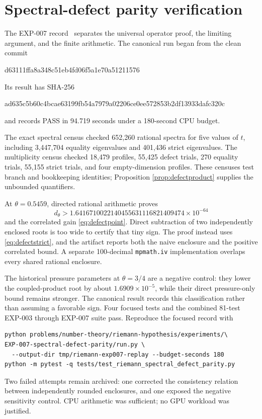 ﻿\documentclass[11pt]{article}
\theoremstyle{remark}
\begin{document}
\section{Spectral-defect parity verification}

The EXP-007 record~\cite{RecordVII} separates the universal operator proof,
the limiting argument, and the finite arithmetic. The canonical run began
from the clean commit
\begin{center}\small\ttfamily
d63111ffa8a348c51eb4fd06f5a1e70a51211576
\end{center}
Its result has SHA-256
\begin{center}\small\ttfamily
ad635c5b60c4bcae63199fb54a7979a02206ce0ee572853b2df13933dafc320c
\end{center}
and records PASS in 94.719 seconds under a 180-second CPU budget.

The exact spectral census checked 652,260 rational spectra for five values of
$t$, including 3,447,704 equality eigenvalues and 401,436 strict eigenvalues.
The multiplicity census checked 18,479 profiles, 55,425 defect trials, 270
equality trials, 55,155 strict trials, and four empty-dimension profiles. These
censuses test branch and bookkeeping identities; Proposition
\ref{prop:defectproduct} supplies the unbounded quantifiers.

At $\theta=0.5459$, directed rational arithmetic proves
\[
 d_\theta>
 1.6416710022140455631116821409474\times10^{-64}
\]
and the correlated gain \eqref{eq:defectpoint}. Direct subtraction of two
independently enclosed roots is too wide to certify that tiny sign. The proof
instead uses \eqref{eq:defectstrict}, and the artifact reports both the naive
enclosure and the positive correlated bound. A separate 100-decimal
\texttt{mpmath.iv} implementation overlaps every shared rational enclosure.

The historical pressure parameters at $\theta=3/4$ are a negative control:
they lower the coupled-product root by about $1.6909\times10^{-5}$, while their
direct pressure-only bound remains stronger. The canonical result records this
classification rather than assuming a favorable sign. Four focused tests and
the combined 81-test EXP-003 through EXP-007 suite pass. Reproduce the focused
record with
\begin{verbatim}
python problems/number-theory/riemann-hypothesis/experiments/\
EXP-007-spectral-defect-parity/run.py \
  --output-dir tmp/riemann-exp007-replay --budget-seconds 180
python -m pytest -q tests/test_riemann_spectral_defect_parity.py
\end{verbatim}
Two failed attempts remain archived: one corrected the consistency relation
between independently rounded enclosures, and one exposed the negative
sensitivity control. CPU arithmetic was sufficient; no GPU workload was
justified.
\end{document}

